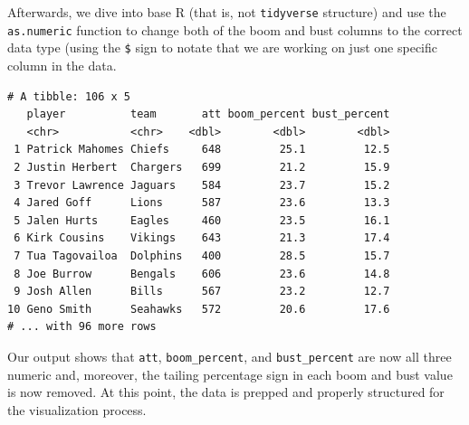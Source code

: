 \documentclass[
  letterpaper,
]{krantz}
\newenvironment{Shaded}{\begin{snugshade}}{\end{snugshade}}
\newcommand{\AttributeTok}[1]{\textcolor[rgb]{0.40,0.45,0.13}{#1}}
\newcommand{\FunctionTok}[1]{\textcolor[rgb]{0.28,0.35,0.67}{#1}}
\newcommand{\NormalTok}[1]{\textcolor[rgb]{0.00,0.23,0.31}{#1}}
\newcommand{\OtherTok}[1]{\textcolor[rgb]{0.00,0.23,0.31}{#1}}
\newcommand{\SpecialCharTok}[1]{\textcolor[rgb]{0.37,0.37,0.37}{#1}}
\newcommand{\StringTok}[1]{\textcolor[rgb]{0.13,0.47,0.30}{#1}}
\begin{document}
Afterwards, we dive into base R (that is, not \texttt{tidyverse}
structure) and use the \texttt{as.numeric} function to change both of
the boom and bust columns to the correct data type (using the
\texttt{\$} sign to notate that we are working on just one specific
column in the data.

\begin{Shaded}
\end{Shaded}

\begin{verbatim}
# A tibble: 106 x 5
   player          team       att boom_percent bust_percent
   <chr>           <chr>    <dbl>        <dbl>        <dbl>
 1 Patrick Mahomes Chiefs     648         25.1         12.5
 2 Justin Herbert  Chargers   699         21.2         15.9
 3 Trevor Lawrence Jaguars    584         23.7         15.2
 4 Jared Goff      Lions      587         23.6         13.3
 5 Jalen Hurts     Eagles     460         23.5         16.1
 6 Kirk Cousins    Vikings    643         21.3         17.4
 7 Tua Tagovailoa  Dolphins   400         28.5         15.7
 8 Joe Burrow      Bengals    606         23.6         14.8
 9 Josh Allen      Bills      567         23.2         12.7
10 Geno Smith      Seahawks   572         20.6         17.6
# ... with 96 more rows
\end{verbatim}

Our output shows that \texttt{att}, \texttt{boom\_percent}, and
\texttt{bust\_percent} are now all three numeric and, moreover, the
tailing percentage sign in each boom and bust value is now removed. At
this point, the data is prepped and properly structured for the
visualization process.
\end{document}

